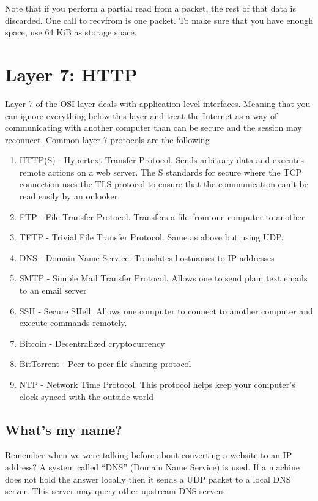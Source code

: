 Note that if you perform a partial read from a packet, the rest of that data is discarded.
One call to recvfrom is one packet.
To make sure that you have enough space, use 64 KiB as storage space.

\section{Layer 7: HTTP}

Layer 7 of the OSI layer deals with application-level interfaces.
Meaning that you can ignore everything below this layer and treat the Internet as a way of communicating with another computer than can be secure and the session may reconnect.
Common layer 7 protocols are the following

\begin{enumerate}
  \item HTTP(S) - Hypertext Transfer Protocol.
    Sends arbitrary data and executes remote actions on a web server.
    The S standards for secure where the TCP connection uses the TLS protocol to ensure that the communication can't be read easily by an onlooker.
  \item FTP - File Transfer Protocol.
    Transfers a file from one computer to another
  \item TFTP - Trivial File Transfer Protocol.
    Same as above but using UDP.
  \item DNS - Domain Name Service.
    Translates hostnames to IP addresses
  \item SMTP - Simple Mail Transfer Protocol.
    Allows one to send plain text emails to an email server
  \item SSH - Secure SHell.
    Allows one computer to connect to another computer and execute commands remotely.
  \item Bitcoin - Decentralized cryptocurrency
  \item BitTorrent - Peer to peer file sharing protocol
  \item NTP - Network Time Protocol.
    This protocol helps keep your computer's clock synced with the outside world
\end{enumerate}

\subsection{What's my name?}

Remember when we were talking before about converting a website to an IP address?
A system called ``DNS'' (Domain Name Service) is used.
If a machine does not hold the answer locally then it sends a UDP packet to a local DNS server.
This server may query other upstream DNS servers.

